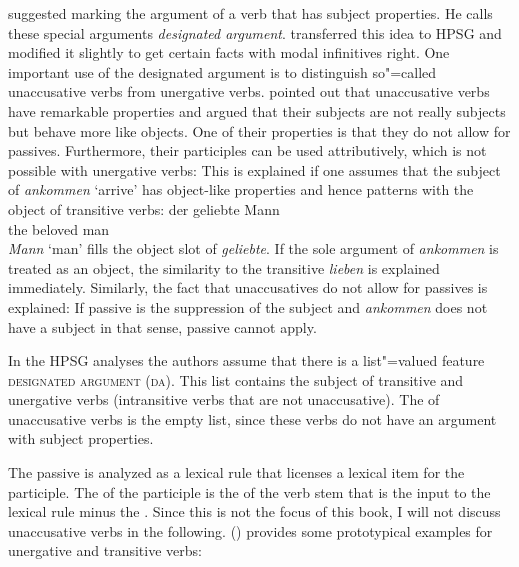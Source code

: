 \citet[]{Haider86} suggested marking the argument of a verb that has subject properties. He calls
these special arguments \emph{designated argument}. \citet{HM94a} transferred this idea to HPSG and
\citet{Mueller2003e} modified it slightly to get certain facts with modal infinitives
right. One important use of the designated argument is to distinguish so"=called
unaccusative verbs from unergative verbs. \citet{Perlmutter78} pointed out that unaccusative verbs
have remarkable properties and argued that their subjects are not really subjects but behave more
like objects. One of their properties is that they do not allow for passives. Furthermore, their
participles can be used attributively, which is not possible with unergative verbs:
\eal
{}
\zl
This is explained if one assumes that the subject of \emph{ankommen} `arrive' has object-like
properties and hence patterns with the object of transitive verbs:
\ea
\gll der geliebte Mann\\
     the beloved  man\\
\z
\emph{Mann} `man' fills the object slot of \emph{geliebte}. If the sole argument of \emph{ankommen}
is treated as an object, the similarity to the transitive \emph{lieben} is explained
immediately. Similarly, the fact that unaccusatives do not allow for passives is explained: If
passive is the suppression of the subject and \emph{ankommen} does not have a subject in that sense,
passive cannot apply.
\eal
{}
\zl

In the HPSG analyses the authors assume that there is a list"=valued feature \textsc{designated
  argument} (\textsc{da}). This list contains the subject of transitive and unergative verbs
(intransitive verbs that are not unaccusative). The \dav of unaccusative verbs is the empty list,
since these verbs do not have an argument with subject properties.

The passive is analyzed as a lexical rule that licenses a lexical item for the participle. The
\argstl of the participle is the \argstl of the verb stem that is the input to the lexical rule minus
the \dalist. Since this is not the focus of this book, I will not discuss unaccusative verbs in the
following. () provides some prototypical examples for unergative and transitive verbs:

